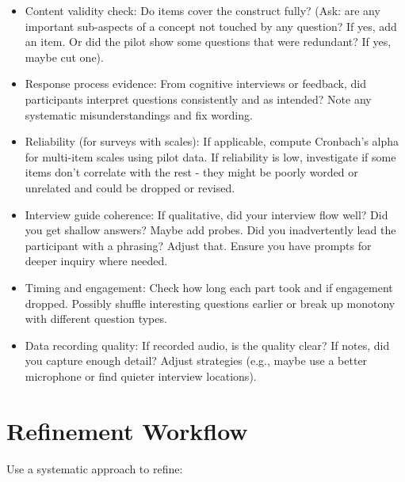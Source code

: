 \documentclass[10pt]{article}
\begin{document}
\begin{itemize}
  \item Content validity check: Do items cover the construct fully? (Ask: are any important sub-aspects of a concept not touched by any question? If yes, add an item. Or did the pilot show some questions that were redundant? If yes, maybe cut one).
  \item Response process evidence: From cognitive interviews or feedback, did participants interpret questions consistently and as intended? Note any systematic misunderstandings and fix wording.
  \item Reliability (for surveys with scales): If applicable, compute Cronbach's alpha for multi-item scales using pilot data. If reliability is low, investigate if some items don't correlate with the rest - they might be poorly worded or unrelated and could be dropped or revised.
  \item Interview guide coherence: If qualitative, did your interview flow well? Did you get shallow answers? Maybe add probes. Did you inadvertently lead the participant with a phrasing? Adjust that. Ensure you have prompts for deeper inquiry where needed.
  \item Timing and engagement: Check how long each part took and if engagement dropped. Possibly shuffle interesting questions earlier or break up monotony with different question types.
  \item Data recording quality: If recorded audio, is the quality clear? If notes, did you capture enough detail? Adjust strategies (e.g., maybe use a better microphone or find quieter interview locations).
\end{itemize}

\section*{Refinement Workflow}
Use a systematic approach to refine:
\end{document}
